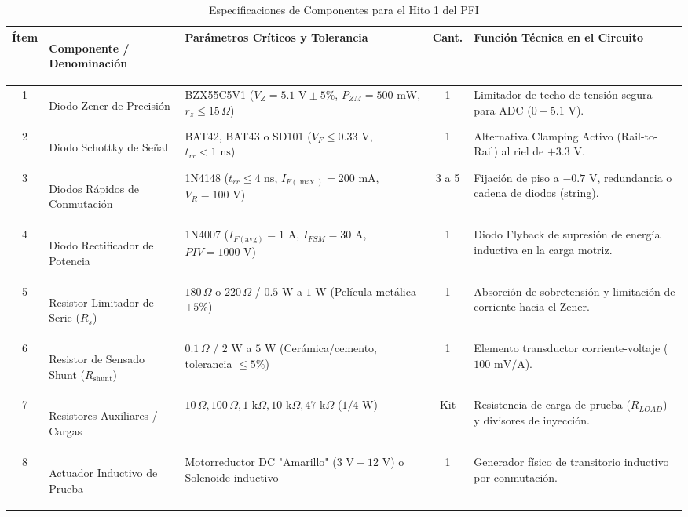\documentclass[11pt, a4paper]{article}
\begin{document}
\begin{table}[h!]
\centering
\caption{Especificaciones de Componentes para el Hito 1 del PFI}
\label{tab:bom_hito1}
\footnotesize
\renewcommand{\arraystretch}{1.4}
\begin{tabularx}{\textwidth}{@{} c >{\bfseries\raggedright\arraybackslash}p{3cm} >{\raggedright\arraybackslash}p{4.5cm} c X @{}}
\toprule
\textbf{Ítem} & \textbf{Componente / Denominación} & \textbf{Parámetros Críticos y Tolerancia} & \textbf{Cant.} & \textbf{Función Técnica en el Circuito} \\
\midrule
1 & Diodo Zener de Precisión & BZX55C5V1 ($V_Z = 5.1\text{ V} \pm 5\%$, $P_{ZM} = 500\text{ mW}$, $r_z \le 15\,\Omega$) & 1 & Limitador de techo de tensión segura para ADC ($0 - 5.1\text{ V}$). \\
2 & Diodo Schottky de Señal & BAT42, BAT43 o SD101 ($V_F \le 0.33\text{ V}$, $t_{rr} < 1\text{ ns}$) & 1 & Alternativa Clamping Activo (Rail-to-Rail) al riel de $+3.3\text{ V}$. \\
3 & Diodos Rápidos de Conmutación & 1N4148 ($t_{rr} \le 4\text{ ns}$, $I_{F(\max)} = 200\text{ mA}$, $V_{R} = 100\text{ V}$) & 3 a 5 & Fijación de piso a $-0.7\text{ V}$, redundancia o cadena de diodos (string). \\
4 & Diodo Rectificador de Potencia & 1N4007 ($I_{F(\text{avg})} = 1\text{ A}$, $I_{FSM} = 30\text{ A}$, $PIV = 1000\text{ V}$) & 1 & Diodo Flyback de supresión de energía inductiva en la carga motriz. \\
5 & Resistor Limitador de Serie ($R_s$) & $180\,\Omega$ o $220\,\Omega$ / $0.5\text{ W}$ a $1\text{ W}$ (Película metálica $\pm 5\%$) & 1 & Absorción de sobretensión y limitación de corriente hacia el Zener. \\
6 & Resistor de Sensado Shunt ($R_{\text{shunt}}$) & $0.1\,\Omega$ / $2\text{ W}$ a $5\text{ W}$ (Cerámica/cemento, tolerancia $\le 5\%$) & 1 & Elemento transductor corriente-voltaje ($100\text{ mV/A}$). \\
7 & Resistores Auxiliares / Cargas & $10\,\Omega, 100\,\Omega, 1\text{ k}\Omega, 10\text{ k}\Omega, 47\text{ k}\Omega$ ($1/4\text{ W}$) & Kit & Resistencia de carga de prueba ($R_{LOAD}$) y divisores de inyección. \\
8 & Actuador Inductivo de Prueba & Motorreductor DC "Amarillo" ($3\text{ V} - 12\text{ V}$) o Solenoide inductivo & 1 & Generador físico de transitorio inductivo por conmutación. \\
\bottomrule
\end{tabularx}
\end{table}
\end{document}
